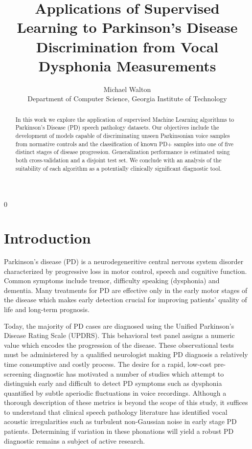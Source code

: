 \documentclass[12pt]{article}
\newcommand{\blind}{0}
\begin{document}
%

\def\spacingset#1{\renewcommand{\baselinestretch}%
{#1}\small\normalsize} \spacingset{1}



\blind
{
  \title{\bf Applications of Supervised Learning to Parkinson's Disease Discrimination from Vocal Dysphonia Measurements}
  \author{Michael Walton\\
    Department of Computer Science, Georgia Institute of Technology\\}
  \maketitle
} \fi



\begin{abstract}
In this work we explore the application of supervised Machine Learning algorithms to Parkinson's Disease (PD) speech pathology datasets. Our objectives include the development of models capable of discriminating unseen Parkinsonian voice samples from normative controls and the classification of known PD+ samples into one of five distinct stages of disease progression. Generalization performance is estimated using both cross-validation and a disjoint test set. We conclude with an analysis of the suitability of each algorithm as a potentially clinically significant diagnostic tool.
\end{abstract}

\spacingset{1.45}
\section{Introduction}
\label{sec:intro}

Parkinson's disease (PD) is a neurodegeneritive central nervous system disorder characterized by progressive loss in motor control, speech and cognitive function. Common symptoms include tremor, difficulty speaking (dysphonia) and dementia. Many treatments for PD are effective only in the early motor stages of the disease which makes early detection crucial for improving patients' quality of life and long-term prognosis.

Today, the majority of PD cases are diagnosed using the Unified Parkinson's Disease Rating Scale (UPDRS). This behavioral test panel assigns a numeric value which encodes the progression of the disease. These observational tests must be administered by a qualified neurologist making PD diagnosis a relatively time consumptive and costly process. The desire for a rapid, low-cost pre-screening diagnostic has motivated a number of studies which attempt to distinguish early and difficult to detect PD symptoms such as dysphonia quantified by subtle aperiodic fluctuations in voice recordings. Although a thorough description of these metrics is beyond the scope of this study, it suffices to understand that clinical speech pathology literature has identified vocal acoustic irregularities such as turbulent non-Gaussian noise in early stage PD patients. Determining if variation in these phonations will yield a robust PD diagnostic remains a subject of active research.
\end{document}
